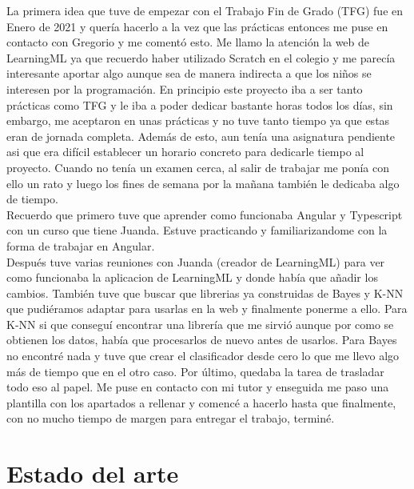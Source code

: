 \documentclass[a4paper, 12pt]{book}
\begin{document}
La primera idea que tuve de empezar con el Trabajo Fin de Grado (TFG) fue en Enero de 2021 y quería hacerlo a la vez que las prácticas entonces me puse en contacto con Gregorio y me comentó esto. Me llamo la atención la web de LearningML ya que recuerdo haber utilizado Scratch en el colegio y me parecía interesante aportar algo aunque sea de manera indirecta a que los niños se interesen por la programación.
En principio este proyecto iba a ser tanto prácticas como TFG y le iba a poder dedicar bastante horas todos los días, sin embargo, me aceptaron en unas prácticas y no tuve tanto tiempo ya que estas eran de jornada completa. Además de esto, aun tenía una asignatura pendiente asi que era difícil establecer un horario concreto para dedicarle tiempo al proyecto. Cuando no tenía un examen cerca, al salir de trabajar me ponía con ello un rato y luego los fines de semana por la mañana también le dedicaba algo de tiempo. \\
Recuerdo que primero tuve que aprender como funcionaba Angular y Typescript con un curso que tiene Juanda. Estuve practicando y familiarizandome con la forma de trabajar en Angular.\\
Después tuve varias reuniones con Juanda (creador de LearningML) para ver como funcionaba la aplicacion de LearningML y donde había que añadir los cambios.
También tuve que buscar que librerias ya construidas de Bayes y K-NN que pudiéramos adaptar para usarlas en la web y finalmente ponerme a ello. Para K-NN si que conseguí encontrar una librería que me sirvió aunque por como se obtienen los datos, había que procesarlos de nuevo antes de usarlos. Para Bayes no encontré nada y tuve que crear el clasificador desde cero lo que me llevo algo más de tiempo que en el otro caso.
Por último, quedaba la tarea de trasladar todo eso al papel. Me puse en contacto con mi tutor y enseguida me paso una plantilla con los apartados a rellenar y comencé a hacerlo hasta que finalmente, con no mucho tiempo de margen para entregar el trabajo, terminé.



\cleardoublepage
\chapter{Estado del arte}
\label{chap:estado}
\end{document}
